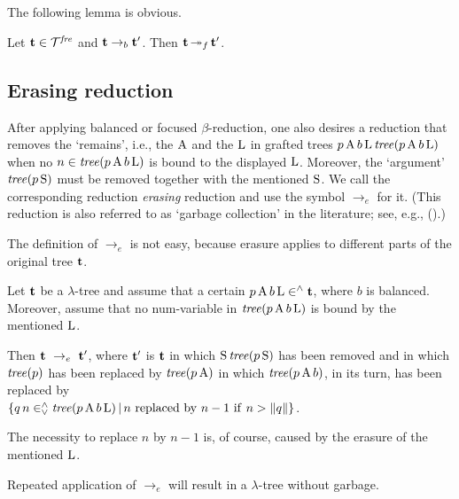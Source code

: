 \documentclass[submission,copyright,creativecommons]{eptcs}
\begin{document}
The following lemma is obvious.
\begin{Lem}
Let ${\bf t} \in {\cal T}^{\it fre}$ and ${\bf t} \rightarrow_b {\bf t}'$. Then ${\bf t} \,{\twoheadrightarrow_{f}}\, {\bf t}'$.
\end{Lem}


\subsection{Erasing reduction}\label{SecEra}

After applying balanced or focused $\beta$-reduction, one also desires a reduction that removes the `remains', i.e., the ${\rm A}$ and the ${\rm L}$ in grafted trees $p \, {\rm A} \, b \, {\rm L} \, {\it tree}(p \, {\rm A} \, b \, {\rm L})$ when no $n \in {\it tree}(p \, {\rm A} \, b \, {\rm L})$ is bound to the displayed ${\rm L}$.
Moreover, the `argument' ${\it tree}(p \, {\rm S})$ must be removed together with the mentioned ${\rm S}$. We call the corresponding reduction {\em erasing\/} reduction and use the symbol $\rightarrow_e$ for it. (This reduction is also referred to as `garbage collection' in the literature; see, e.g., (\cite{Ros93}).) %

The definition of $\rightarrow_e$ is not easy, because erasure applies to different parts of the original tree ${\bf t}$.

\begin{Def}
Let ${\bf t}$ be a $\lambda$-tree and assume that a certain $p \, {\rm A} \, b \, {\rm L} \in^{\wedge} {\bf t}$, where $b$ is balanced. Moreover, assume that no num-variable in ${\it tree}(p \, {\rm A} \, b \, {\rm L})$ is bound by the mentioned ${\rm L}$.

Then ${\bf t} ~\rightarrow_e~ {\bf t'}$, where ${\bf t}'$ is ${\bf t}$ in which ${\rm S} \, {\it tree}(p \, {\rm S})$ has been removed and in which ${\it tree}(p)$ has been replaced by ${\it tree}(p \, {\rm A})$ in which ${\it tree}(p \, {\rm A} \, b)$, in its turn, has been replaced by\\
$\{q \, n \in^{\wedge}_{\vee} {\it tree}(p \, {\rm A} \, b \, {\rm L}) \, | \, n {\rm ~replaced~ by~} n-1 {\rm ~if~} n > \lVert q \lVert \}$.
\end{Def}

The necessity to replace $n$ by $n - 1$ is, of course, caused by the erasure of the mentioned ${\rm L}$.

Repeated application of $\rightarrow_e$ will result in a $\lambda$-tree without garbage.
\end{document}
